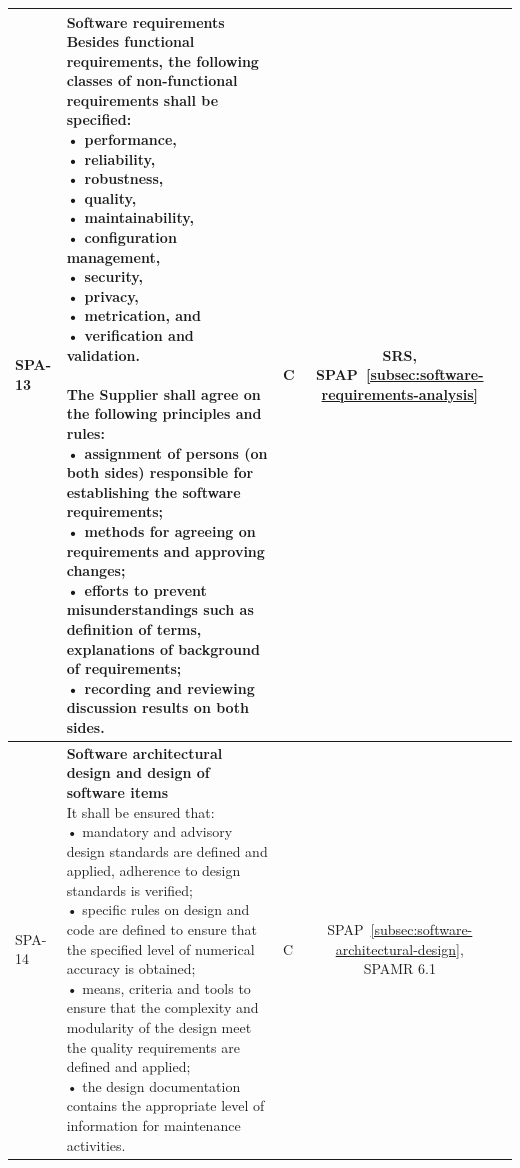 {\begin{xltabular}{\textwidth}{|l|L|l|S|S|}
        SPA-13 &
        {\textbf{Software requirements} \newline
        Besides functional requirements, the following classes of non-functional requirements shall be specified: \newline
        • performance, \newline
        • reliability, \newline
        • robustness, \newline
        • quality, \newline
        • maintainability, \newline
        • configuration management, \newline
        • security, \newline
        • privacy, \newline
        • metrication, and \newline
        • verification and validation. \newline
        \newline
        The Supplier shall agree on the following principles and rules: \newline
        • assignment of persons (on both sides) responsible for establishing the software requirements; \newline
        • methods for agreeing on requirements and approving changes; \newline
        • efforts to prevent misunderstandings such as definition of terms, explanations of background of requirements; \newline
        • recording and reviewing discussion results on both sides.} &
        C &
        {SRS, \newline SPAP~\ref{subsec:software-requirements-analysis}} &
        \\ \hline

        SPA-14 &
        {\textbf{Software architectural design and design of software items} \newline
        It shall be ensured that: \newline
        • mandatory and advisory design standards are defined and applied, adherence to design standards is verified; \newline
        • specific rules on design and code are defined to ensure that the specified level of numerical accuracy is obtained; \newline
        • means, criteria and tools to ensure that the complexity and modularity of the design meet the quality requirements are defined and applied; \newline
        • the design documentation contains the appropriate level of information for maintenance activities.} &
        C &
        {SPAP~\ref{subsec:software-architectural-design}, \newline SPAMR 6.1} &
        \\ \hline


\end{xltabular}}
